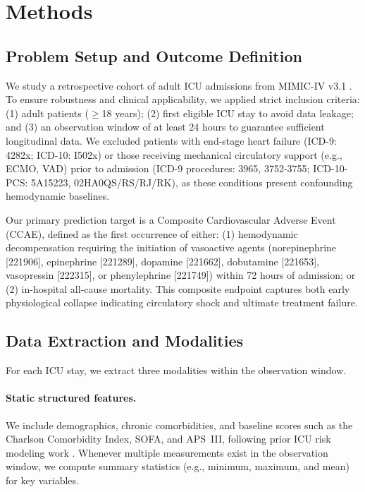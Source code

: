 \documentclass{article}
\begin{document}
\section{Methods}

\subsection{Problem Setup and Outcome Definition}

We study a retrospective cohort of adult ICU admissions from MIMIC-IV v3.1 \cite{Johnson2023MIMICIV}. 
 To ensure robustness and clinical applicability, we applied strict inclusion criteria: (1) adult patients ($\ge$18 years); (2) first eligible ICU stay to avoid data leakage; and (3) an observation window of at least 24 hours to guarantee sufficient longitudinal data. 
 We excluded patients with end-stage heart failure (ICD-9: 4282x; ICD-10: I502x) or those receiving mechanical circulatory support (e.g., ECMO, VAD) prior to admission (ICD-9 procedures: 3965, 3752-3755; ICD-10-PCS: 5A15223, 02HA0QS/RS/RJ/RK), as these conditions present confounding hemodynamic baselines. 
 
 Our primary prediction target is a Composite Cardiovascular Adverse Event (CCAE), defined as the first occurrence of either: 
 (1) hemodynamic decompensation requiring the initiation of vasoactive agents (norepinephrine [221906], epinephrine [221289], dopamine [221662], dobutamine [221653], vasopressin [222315], or phenylephrine [221749]) within 72 hours of admission; 
 or (2) in-hospital all-cause mortality. 
 This composite endpoint captures both early physiological collapse indicating circulatory shock and ultimate treatment failure.
%


\subsection{Data Extraction and Modalities}

For each ICU stay, we extract three modalities within the observation window.

\paragraph{Static structured features.}
We include demographics, chronic comorbidities, and baseline scores such as the Charlson Comorbidity Index, SOFA, and APS~III, following prior ICU risk modeling work \cite{Zimmerman2006APACHE4,Huang2022RAAS}.
Whenever multiple measurements exist in the observation window, we compute summary statistics (e.g., minimum, maximum, and mean) for key variables.
\end{document}
